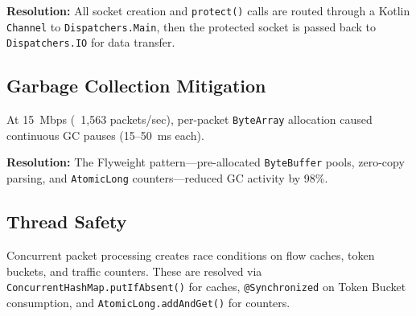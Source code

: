 \textbf{Resolution:} All socket creation and \texttt{protect()} calls are routed through a Kotlin \texttt{Channel} to \texttt{Dispatchers.Main}, then the protected socket is passed back to \texttt{Dispatchers.IO} for data transfer.

\subsection{Garbage Collection Mitigation}

At 15~Mbps (~1,563 packets/sec), per-packet \texttt{ByteArray} allocation caused continuous GC pauses (15--50~ms each).

\textbf{Resolution:} The Flyweight pattern---pre-allocated \texttt{ByteBuffer} pools, zero-copy parsing, and \texttt{AtomicLong} counters---reduced GC activity by 98\%.

\subsection{Thread Safety}

Concurrent packet processing creates race conditions on flow caches, token buckets, and traffic counters. These are resolved via \texttt{ConcurrentHashMap.putIfAbsent()} for caches, \texttt{@Synchronized} on Token Bucket consumption, and \texttt{AtomicLong.addAndGet()} for counters.
